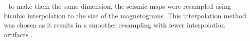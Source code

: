 \documentclass[11pt,a4paper,onecolumn]{report}
\begin{document}



- to make them the same dimension, the seismic maps were resampled using bicubic
interpolation to the size of the magnetograms. This interpolation method was
chosen as it results in a smoother resampling with fewer interpolation artifacts
\citep{keys_cubic_1981}.
\end{document}
